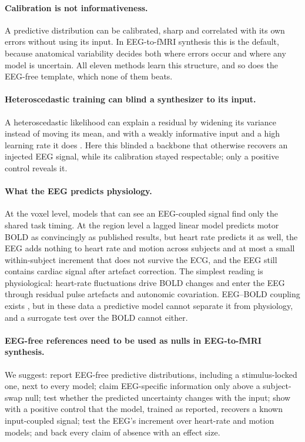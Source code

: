 \paragraph{Calibration is not informativeness.} A predictive distribution can be calibrated, sharp and correlated with its own errors without using its input. In EEG-to-fMRI synthesis this is the default, because anatomical variability decides both where errors occur and where any model is uncertain. All eleven methods learn this structure, and so does the EEG-free template, which none of them beats.

\paragraph{Heteroscedastic training can blind a synthesizer to its input.} A heteroscedastic likelihood can explain a residual by widening its variance instead of moving its mean, and with a weakly informative input and a high learning rate it does \citep{seitzer2022pitfalls}. Here this blinded a backbone that otherwise recovers an injected EEG signal, while its calibration stayed respectable; only a positive control reveals it.

\paragraph{What the EEG predicts physiology.} At the voxel level, models that can see an EEG-coupled signal find only the shared task timing. At the region level a lagged linear model predicts motor BOLD as convincingly as published results, but heart rate predicts it as well, the EEG adds nothing to heart rate and motion across subjects and at most a small within-subject increment that does not survive the ECG, and the EEG still contains cardiac signal after artefact correction. The simplest reading is physiological: heart-rate fluctuations drive BOLD changes and enter the EEG through residual pulse artefacts and autonomic covariation. EEG--BOLD coupling exists \citep{goldman2002simultaneous,laufs2003eeg}, but in these data a predictive model cannot separate it from physiology, and a surrogate test over the BOLD cannot either.

\paragraph{EEG-free references need to be used as nulls in EEG-to-fMRI synthesis.} We suggest: report EEG-free predictive distributions, including a stimulus-locked one, next to every model; claim EEG-specific information only above a subject-swap null; test whether the predicted uncertainty changes with the input; show with a positive control that the model, trained as reported, recovers a known input-coupled signal; test the EEG's increment over heart-rate and motion models; and back every claim of absence with an effect size.

